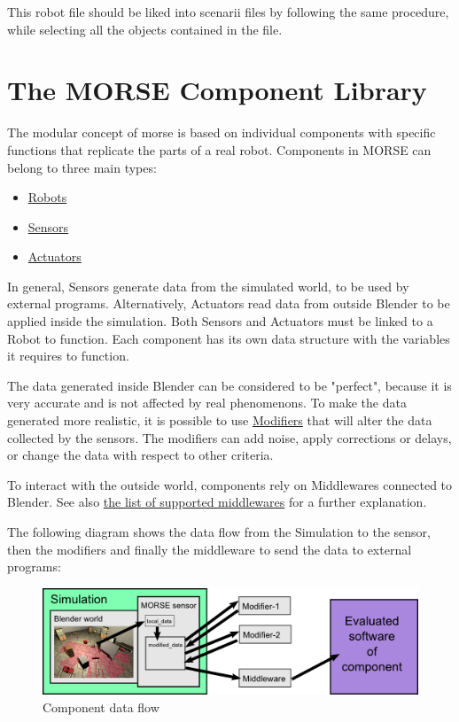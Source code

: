 \documentclass[twoside,a4paper,10pt]{report}
\newcommand{\dokutitlelevelone}[1]{\chapter{#1}}
\newcommand{\dokuitem}{\item}
\begin{document}
This robot file should be liked into scenarii files by following the same procedure, while selecting all the objects contained in the file.

\dokutitlelevelone{The MORSE Component Library}
\label{1d548ae3d571b50e147fca31be425d0f}%
\label{004fdec0cc1a00c19c57e892b7eb1400}%

The modular concept of morse is based on individual components with specific functions that replicate the parts of a real robot. Components in MORSE can belong to three main types:


\begin{itemize}
\dokuitem  \hyperref[d69ac14cd721dd995822d4e984f48116]{ Robots}
\dokuitem  \hyperref[029aee483db9ae244d7a5cb353e74602]{ Sensors}
\dokuitem  \hyperref[2068e59180763f350d66a42e828e7f96]{ Actuators}
\end{itemize}

In general, Sensors generate data from the simulated world, to be used by external programs. Alternatively, Actuators read data from outside Blender to be applied inside the simulation. Both Sensors and Actuators must be linked to a Robot to function.
Each component has its own data structure with the variables it requires to function.

The data generated inside Blender can be considered to be "perfect", because it is very accurate and is not affected by real phenomenons. To make the data generated more realistic, it is possible to use \hyperref[bf24b44a8cc99e648657b164c8aba758]{ Modifiers} that will alter the data collected by the sensors. The modifiers can add noise, apply corrections or delays, or change the data with respect to other criteria.

To interact with the outside world, components rely on Middlewares connected to Blender. See also \hyperref[9a05db9c4b60b0527010fd997682f523]{ the list of supported middlewares} for a further explanation.

The following diagram shows the data flow from the Simulation to the sensor, then the modifiers and finally the middleware to send the data to external programs:
\begin{figure}[h]
\centering
\includegraphics[width=500pt]{component_diagram.png}
\caption{Component data flow}
\end{figure}
\end{document}
